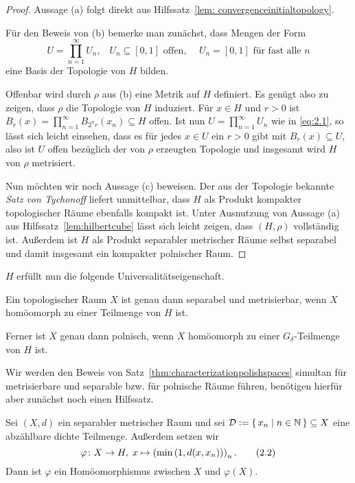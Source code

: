 \documentclass[../main/main.tex]{subfiles}
\begin{document}
	\begin{proof}
		Aussage (a) folgt direkt aus Hilfssatz~\ref{lem: convergenceinitialtopology}.
		
		Für den Beweis von (b) bemerke man zunächst, dass Mengen der Form 
		\[U = \prod_{n=1}^{\infty} U_n\text{,} \quad U_n \subseteq [0, 1] \text{ offen, }
		\quad U_n = [0, 1] \text{ für fast alle } n \label{eq:2.1} \tag{2.1}\]
		eine Basis der Topologie von $H$ bilden.
		
		Offenbar wird durch $\rho$ aus (b) eine Metrik auf $H$ definiert. 
		Es genügt also zu zeigen, dass $\rho$ die Topologie von $H$ induziert. 
		Für $x \in H$ und $r > 0$ ist 
		$B_r(x) = \prod_{n=1}^{\infty} B_{2^n r}(x_n) \subseteq H$ 
		offen. Ist nun $U = \prod_{n=1}^{\infty} U_n$ wie in \eqref{eq:2.1}, 
		so lässt sich leicht einsehen, dass es für jedes $x \in U$ ein $r > 0$ 
		gibt mit $B_r(x) \subseteq U$, also ist $U$ offen bezüglich der von $\rho$ 
		erzeugten Topologie und insgesamt wird $H$ von $\rho$ metrisiert.
		
		Nun möchten wir noch Aussage (c) beweisen. Der aus der Topologie bekannte \emph{Satz von Tychonoff} liefert 
		unmittelbar, dass $H$ als Produkt kompakter topologischer Räume 
		ebenfalls kompakt ist.
		Unter Ausnutzung von Aussage (a) aus 
		Hilfssatz~\ref{lem:hilbertcube} lässt sich leicht zeigen, dass $(H, \rho)$ 
		vollständig ist. Außerdem ist $H$ als Produkt separabler metrischer Räume selbst separabel und 
		damit insgesamt ein kompakter polnischer Raum.
	\end{proof}
	
	$H$ erfüllt nun die folgende Universalitätseigenschaft.
	
	\begin{Satz}
		\label{thm:characterizationpolishspaces}
		Ein topologischer Raum $X$ ist genau dann separabel und metrisierbar, wenn $X$ homöomorph zu einer Teilmenge von $H$ ist.
		
		Ferner ist $X$ genau dann polnisch, wenn $X$ homöomorph zu einer $G_\delta$-Teilmenge von $H$ ist.
	\end{Satz}
	
	Wir werden den Beweis von Satz~\ref{thm:characterizationpolishspaces} simultan für metrisierbare und 
	separable bzw. für polnische Räume führen, benötigen hierfür aber zunächst noch einen Hilfssatz.
	
	\begin{Hilfssatz}
		\label{lem:characterizationpolishspaces}
		Sei $(X, d)$ ein separabler metrischer Raum und sei 
		$\mathcal{D} \vcentcolon = \left\{\, x_n \; \middle| \; n \in \mathbb{N} \,\right\} \subseteq X$ eine abzählbare 
		dichte Teilmenge. Außerdem setzen wir
		\[\varphi \colon X \to H, \; x \mapsto \left(\min \left(1, d(x, x_n) \right) \right)_n  \text{.} \label{eq:2.2} \tag{2.2}\]
		Dann ist $\varphi$ ein Homöomorphismus zwischen $X$ und $\varphi(X)$.
	\end{Hilfssatz}
	
\end{document}
